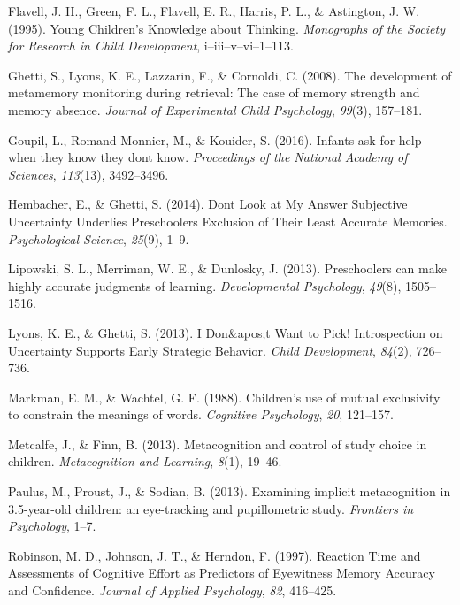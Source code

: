 \documentclass[10pt, letterpaper]{article}
\begin{document}
\hypertarget{ref-Flavell1995}{}
Flavell, J. H., Green, F. L., Flavell, E. R., Harris, P. L., \&
Astington, J. W. (1995). Young Children's Knowledge about Thinking.
\emph{Monographs of the Society for Research in Child Development},
i--iii--v--vi--1--113.

\hypertarget{ref-Ghetti2008}{}
Ghetti, S., Lyons, K. E., Lazzarin, F., \& Cornoldi, C. (2008). The
development of metamemory monitoring during retrieval: The case of
memory strength and memory absence. \emph{Journal of Experimental Child
Psychology}, \emph{99}(3), 157--181.

\hypertarget{ref-Goupil2016}{}
Goupil, L., Romand-Monnier, M., \& Kouider, S. (2016). Infants ask for
help when they know they dont know. \emph{Proceedings of the National
Academy of Sciences}, \emph{113}(13), 3492--3496.

\hypertarget{ref-Hembacher2014}{}
Hembacher, E., \& Ghetti, S. (2014). Dont Look at My Answer Subjective
Uncertainty Underlies Preschoolers Exclusion of Their Least Accurate
Memories. \emph{Psychological Science}, \emph{25}(9), 1--9.

\hypertarget{ref-Lipowski2013}{}
Lipowski, S. L., Merriman, W. E., \& Dunlosky, J. (2013). Preschoolers
can make highly accurate judgments of learning. \emph{Developmental
Psychology}, \emph{49}(8), 1505--1516.

\hypertarget{ref-Lyons2013}{}
Lyons, K. E., \& Ghetti, S. (2013). I Don\&apos;t Want to Pick!
Introspection on Uncertainty Supports Early Strategic Behavior.
\emph{Child Development}, \emph{84}(2), 726--736.

\hypertarget{ref-Markman1988}{}
Markman, E. M., \& Wachtel, G. F. (1988). Children's use of mutual
exclusivity to constrain the meanings of words. \emph{Cognitive
Psychology}, \emph{20}, 121--157.

\hypertarget{ref-Metcalfe2013}{}
Metcalfe, J., \& Finn, B. (2013). Metacognition and control of study
choice in children. \emph{Metacognition and Learning}, \emph{8}(1),
19--46.

\hypertarget{ref-Paulus2013}{}
Paulus, M., Proust, J., \& Sodian, B. (2013). Examining implicit
metacognition in 3.5-year-old children: an eye-tracking and
pupillometric study. \emph{Frontiers in Psychology}, 1--7.

\hypertarget{ref-Robinson1997}{}
Robinson, M. D., Johnson, J. T., \& Herndon, F. (1997). Reaction Time
and Assessments of Cognitive Effort as Predictors of Eyewitness Memory
Accuracy and Confidence. \emph{Journal of Applied Psychology},
\emph{82}, 416--425.
\end{document}
